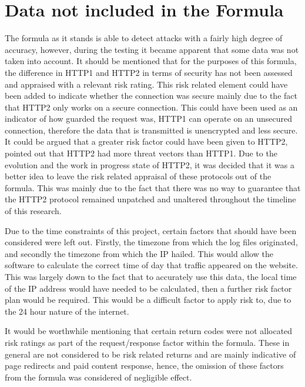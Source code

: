 \section{Data not included in the Formula}

The formula as it stands is able to detect attacks with a fairly high degree of accuracy, however, during the testing it became apparent that some data was not taken into account. It should be mentioned that for the purposes of this formula, the difference in HTTP1 and HTTP2 in terms of security has not been assessed and appraised with a relevant risk rating. This risk related element could have been added to indicate whether the connection was secure mainly due to the fact that HTTP2 only works on a secure connection. This could have been used as an indicator of how guarded the request was, HTTP1 can operate on an unsecured connection, therefore the data that is transmitted is unencrypted and less secure. It could be argued that a greater risk factor could have been given to HTTP2, \cite{tripathi2018slow} pointed out that HTTP2 had more threat vectors than HTTP1. Due to the evolution and the work in progress state of HTTP2, it was decided that it was a better idea to leave the risk related appraisal of these protocols out of the formula. This was mainly due to the fact that there was no way to guarantee that the HTTP2 protocol remained unpatched and unaltered throughout the timeline of this research.

Due to the time constraints of this project, certain factors that should have been considered were left out. Firstly, the timezone from which the log files originated, and secondly the timezone from which the IP hailed. This would allow the software to calculate the correct time of day that traffic appeared on the website. This was largely down to the fact that to accurately use this data, the local time of the IP address would have needed to be calculated, then a further risk factor plan would be required. This would be a difficult factor to apply risk to, due to the 24 hour nature of the internet.

It would be worthwhile mentioning that certain return codes were not allocated risk ratings as part of the request/response factor within the formula. These in general are not considered to be risk related returns and are mainly indicative of page redirects and paid content response, hence, the omission of these factors from the formula was considered of negligible effect.
